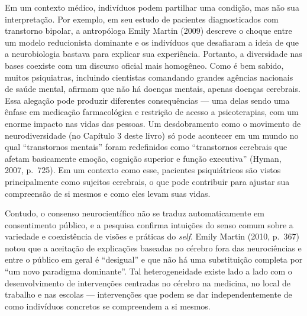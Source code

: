 Em um contexto médico, indivíduos podem partilhar uma condição, mas não
sua interpretação. Por exemplo, em seu estudo de pacientes
diagnosticados com transtorno bipolar, a antropóloga Emily Martin (2009)
descreve o choque entre um modelo reducionista dominante e os indivíduos
que desafiaram a ideia de que a neurobiologia bastava para explicar sua
experiência. Portanto, a diversidade nas bases coexiste com um discurso
oficial mais homogêneo. Como é bem sabido, muitos psiquiatras, incluindo
cientistas comandando grandes agências nacionais de saúde mental,
afirmam que não há doenças mentais, apenas doenças cerebrais. Essa
alegação pode produzir diferentes consequências --- uma delas sendo uma
ênfase em medicação farmacológica e restrição de acesso a psicoterapias,
com um enorme impacto nas vidas das pessoas. Um desdobramento como o
movimento de neurodiversidade (no Capítulo 3 deste livro) só pode
acontecer em um mundo no qual ``transtornos mentais'' foram redefinidos
como ``transtornos cerebrais que afetam basicamente emoção, cognição
superior e função executiva'' (Hyman, 2007, p.~725). Em um contexto como
esse, pacientes psiquiátricos são vistos principalmente como sujeitos
cerebrais, o que pode contribuir para ajustar sua compreensão de si
mesmos e como eles levam suas vidas.

Contudo, o consenso neurocientífico não se traduz automaticamente em
consentimento público, e a pesquisa confirma intuições do senso comum
sobre a variedade e coexistência de visões e práticas do \emph{self}. Emily
Martin (2010, p.~367) notou que a aceitação de explicações baseadas no
cérebro fora das neurociências e entre o público em geral é ``desigual''
e que não há uma substituição completa por ``um novo paradigma
dominante''. Tal heterogeneidade existe lado a lado com o
desenvolvimento de intervenções centradas no cérebro na medicina, no
local de trabalho e nas escolas --- intervenções que podem se dar
independentemente de como indivíduos concretos se compreendem a si
mesmos.

